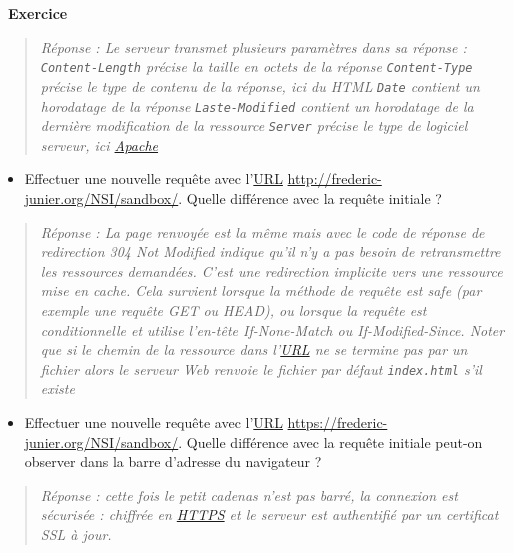\documentclass[
  11pt,
]{article}
\newcommand{\passthrough}[1]{#1}
\providecommand{\tightlist}{%
  \setlength{\itemsep}{0pt}\setlength{\parskip}{0pt}}
\newcounter{exo}
\newenvironment{exercice}[1]
{\par \medskip   \addtocounter{exo}{1} \noindent  
\begin{bclogo}[arrondi =0.1,   noborder = true, logo=\bccrayon, marge=4]{~\textbf{Exercice} \textbf{\theexo} {\itshape #1} }  \par}
{
\end{bclogo}
 \par \bigskip }
\newcounter{logi}
\begin{document}
\begin{exercice}{}
\begin{enumerate}
  \begin{quote}
  \emph{Réponse : Le serveur transmet plusieurs paramètres dans sa
  réponse :} \emph{\passthrough{\lstinline!Content-Length!} précise la
  taille en octets de la réponse}
  \emph{\passthrough{\lstinline!Content-Type!} précise le type de
  contenu de la réponse, ici du HTML}
  \emph{\passthrough{\lstinline!Date!} contient un horodatage de la
  réponse} \emph{\passthrough{\lstinline!Laste-Modified!} contient un
  horodatage de la dernière modification de la ressource}
  \emph{\passthrough{\lstinline!Server!} précise le type de logiciel
  serveur, ici \href{http://www.apache.org/}{Apache}}
  \end{quote}

  \begin{itemize}
  \tightlist
  \item
    Effectuer une nouvelle requête avec
    l'\href{https://developer.mozilla.org/fr/docs/Glossaire/URL}{URL}
    \url{http://frederic-junier.org/NSI/sandbox/}. Quelle différence
    avec la requête initiale ?
  \end{itemize}

  \begin{quote}
  \emph{Réponse : La page renvoyée est la même mais avec le code de
  réponse de redirection 304 Not Modified indique qu'il n'y a pas besoin
  de retransmettre les ressources demandées. C'est une redirection
  implicite vers une ressource mise en cache. Cela survient lorsque la
  méthode de requête est safe (par exemple une requête GET ou HEAD), ou
  lorsque la requête est conditionnelle et utilise l'en-tête
  If-None-Match ou If-Modified-Since. Noter que si le chemin de la
  ressource dans l'\url{URL} ne se termine pas par un fichier alors le
  serveur Web renvoie le fichier par défaut
  \passthrough{\lstinline!index.html!} s'il existe}
  \end{quote}

  \begin{itemize}
  \tightlist
  \item
    Effectuer une nouvelle requête avec
    l'\href{https://developer.mozilla.org/fr/docs/Glossaire/URL}{URL}
    \url{https://frederic-junier.org/NSI/sandbox/}. Quelle différence
    avec la requête initiale peut-on observer dans la barre d'adresse du
    navigateur ?
  \end{itemize}

  \begin{quote}
  \emph{Réponse : cette fois le petit cadenas n'est pas barré, la
  connexion est sécurisée : chiffrée en \url{HTTPS} et le serveur est
  authentifié par un certificat SSL à jour.}
  \end{quote}


\end{enumerate}
\end{exercice}
\end{document}
